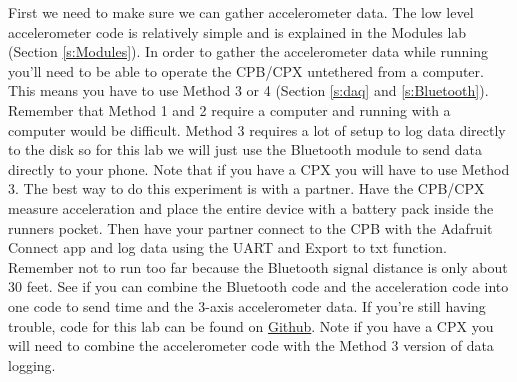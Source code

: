 First we need to make sure we can gather accelerometer data. The low
level accelerometer code is relatively simple and is explained in the
Modules lab (Section \ref{s:Modules}). In order to gather the
accelerometer data while running you'll need to be able to operate the
CPB/CPX untethered from a computer. This means you have to use Method
3 or 4 (Section \ref{s:daq} and \ref{s:Bluetooth}). Remember that
Method 1 and 2 require a computer and running with a computer would be
difficult. Method 3 requires a lot of setup to log data directly to
the disk so for this lab we will just use the Bluetooth module to send
data directly to your phone. Note that if you have a CPX you will have
to use Method 3. The best way to do this experiment is with a
partner. Have the CPB/CPX measure acceleration and place the entire
device with a battery pack inside the runners pocket. Then have your
partner connect to the CPB with the Adafruit Connect app and log
data using the UART and Export to txt function. Remember not to run
too far because the Bluetooth signal distance is only about 30
feet. See if you can combine the Bluetooth code and the acceleration
code into one code to send time and the 3-axis accelerometer data. If
you're still having trouble, code for this lab can be found
on \href{https://github.com/cmontalvo251/Microcontrollers/tree/master/Circuit_Playground/CircuitPython/pedometer}{Github}. Note
if you have a CPX you will need to combine the accelerometer code with
the Method 3 version of data logging.

